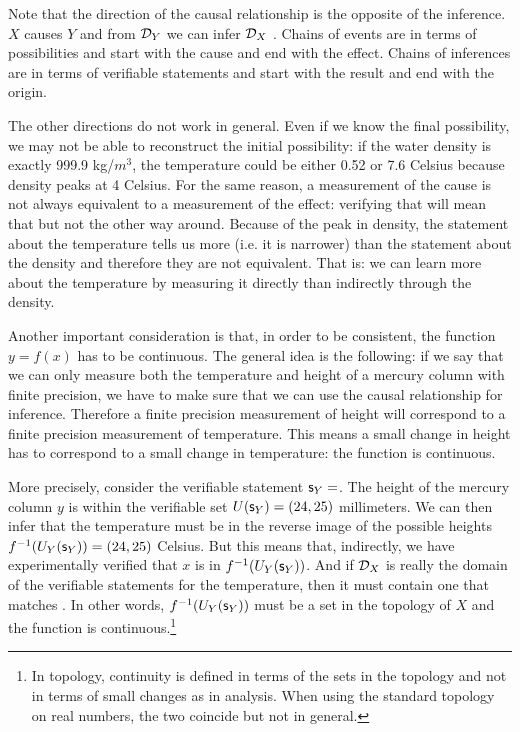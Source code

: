 \documentclass[11pt,letterpaper,fleqn]{memoir} %
\begin{document}
Note that the direction of the causal relationship is the opposite of the inference. $X$ causes $Y$ and from $\mathcal{D}_Y$ we can infer $\mathcal{D}_X$ . Chains of events are in terms of possibilities and start with the cause and end with the effect. Chains of inferences are in terms of verifiable statements and start with the result and end with the origin.

The other directions do not work in general. Even if we know the final possibility, we may not be able to reconstruct the initial possibility: if the water density is exactly 999.9 kg/$m^3$, the temperature could be either 0.52 or 7.6 Celsius because density peaks at 4 Celsius. For the same reason, a measurement of the cause is not always equivalent to a measurement of the effect: verifying that  will mean that  but not the other way around. Because of the peak in density, the statement about the temperature tells us more (i.e. it is narrower) than the statement about the density and therefore they are not equivalent. That is: we can learn more about the temperature by measuring it directly than indirectly through the density.

Another important consideration is that, in order to be consistent, the function $y=f(x)$ has to be continuous. The general idea is the following: if we say that we can only measure both the temperature and height of a mercury column with finite precision, we have to make sure that we can use the causal relationship for inference. Therefore a finite precision measurement of height will correspond to a finite precision measurement of temperature. This means a small change in height has to correspond to a small change in temperature: the function is continuous.

More precisely, consider the verifiable statement $\mathsf{s}_Y=$. The height of the mercury column $y$ is within the verifiable set $U(\mathsf{s}_Y) = (24, 25)$ millimeters. We can then infer that the temperature must be in the reverse image of the possible heights $f^{-1}(U_Y(\mathsf{s}_Y))=(24,25)$ Celsius. But this means that, indirectly, we have experimentally verified that $x$ is in $f^{-1}(U_Y(\mathsf{s}_Y))$. And if $\mathcal{D}_X$ is really the domain of the verifiable statements for the temperature, then it must contain one that matches . In other words, $f^{-1}(U_Y(\mathsf{s}_Y))$ must be a set in the topology of $X$ and the function is continuous.\footnote{In topology, continuity is defined in terms of the sets in the topology and not in terms of small changes as in analysis. When using the standard topology on real numbers, the two coincide but not in general.}
\end{document}
